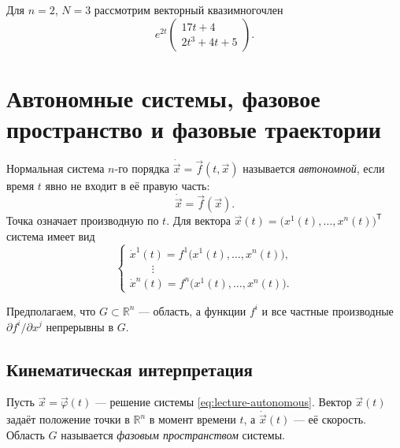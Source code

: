 \documentclass[12pt,a4paper]{article}
\numberwithin{equation}{section}
\newcommand{\R}{\mathbb{R}}
\newcommand{\vect}[1]{\vec{#1}}
\DeclareRobustCommand{\examtag}[1]{\space{\normalfont\small\color{HSEgray}(#1)}}
\begin{document}
\begin{exampleHSE}
Для $n=2$, $N=3$ рассмотрим векторный квазимногочлен
\[
e^{2t}
\begin{pmatrix}
17t+4\\
2t^3+4t+5
\end{pmatrix}.
\]
\end{exampleHSE}

\section[Автономные системы. Фазовые траектории\examtag{вопрос~25}]{Автономные системы, фазовое пространство и фазовые траектории\examtag{вопрос~25}}

\begin{definitionHSE}
Нормальная система $n$-го порядка $\dot{\vect{x}}=\vect f(t,\vect{x})$
называется \textit{автономной}, если время $t$ явно не входит в её правую часть:
\begin{equation}
 \dot{\vect{x}}=\vect f(\vect{x}).
 \label{eq:lecture-autonomous}
\end{equation}
Точка означает производную по $t$. Для вектора
$\vect{x}(t)=\bigl(x^1(t),\ldots,x^n(t)\bigr)^{\mathsf T}$ система имеет вид
\[
 \begin{cases}
 \dot{x}^1(t)=f^1\bigl(x^1(t),\ldots,x^n(t)\bigr),\\
 \hspace{2em}\vdots\\
 \dot{x}^n(t)=f^n\bigl(x^1(t),\ldots,x^n(t)\bigr).
 \end{cases}
\]
\end{definitionHSE}

Предполагаем, что $G\subset\R^n$ --- область, а функции $f^i$ и все
частные производные $\partial f^i/\partial x^j$ непрерывны в $G$.

\subsection{Кинематическая интерпретация}

Пусть $\vect{x}=\vect\varphi(t)$ --- решение системы \eqref{eq:lecture-autonomous}.
Вектор $\vect{x}(t)$ задаёт положение точки в $\R^n$ в момент времени $t$,
а $\dot{\vect{x}}(t)$ --- её скорость. Область $G$ называется
\textit{фазовым пространством} системы.
\end{document}
